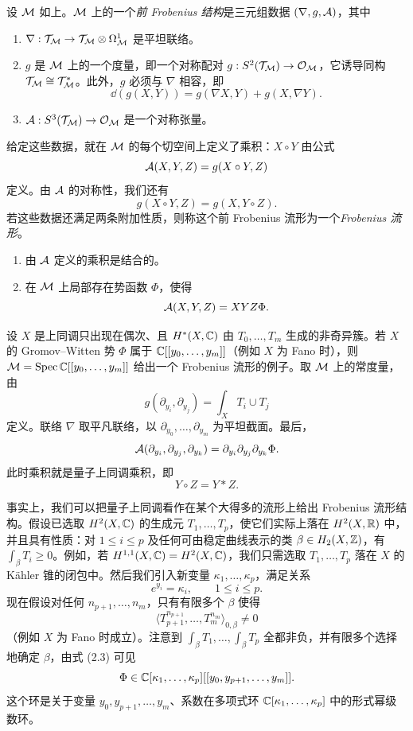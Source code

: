 \begin{definition}
设 $\mathcal{M}$ 如上。$\mathcal{M}$ 上的一个\emph{前 Frobenius 结构}是三元组数据 $(\nabla,g,\mathcal{A})$，其中
\begin{enumerate}[label=(\arabic*)]
\item $\nabla:\mathcal{T}_{\mathcal{M}}\to\mathcal{T}_{\mathcal{M}}\otimes\Omega^1_{\mathcal{M}}$ 是平坦联络。
\item $g$ 是 $\mathcal{M}$ 上的一个度量，即一个对称配对 $g:S^2(\mathcal{T}_{\mathcal{M}})\to\mathcal{O}_{\mathcal{M}}$，它诱导同构 $\mathcal{T}_{\mathcal{M}}\cong\mathcal{T}_{\mathcal{M}}^{*}$。此外，$g$ 必须与 $\nabla$ 相容，即
\[
\dd(g(X,Y))=g(\nabla X,Y)+g(X,\nabla Y).
\]
\item $\mathcal{A}:S^3(\mathcal{T}_{\mathcal{M}})\to\mathcal{O}_{\mathcal{M}}$ 是一个对称张量。
\end{enumerate}
给定这些数据，就在 $\mathcal{M}$ 的每个切空间上定义了乘积：$X\circ Y$ 由公式
\[
\mathcal{A}(X,Y,Z)=g(X\circ Y,Z)
\]
定义。由 $\mathcal{A}$ 的对称性，我们还有
\begin{equation}
g(X\circ Y,Z)=g(X,Y\circ Z). \tag{2.4}
\end{equation}
若这些数据还满足两条附加性质，则称这个前 Frobenius 流形为一个\emph{Frobenius 流形}。
\begin{enumerate}[label=(\arabic*),start=4]
\item 由 $\mathcal{A}$ 定义的乘积是结合的。
\item 在 $\mathcal{M}$ 上局部存在势函数 $\Phi$，使得
\[
\mathcal{A}(X,Y,Z)=XYZ\Phi.
\]
\end{enumerate}
\end{definition}

\begin{example}
设 $X$ 是上同调只出现在偶次、且 $H^{*}(X,\mathbb{C})$ 由 $T_0,\dots,T_m$ 生成的非奇异簇。若 $X$ 的 Gromov–Witten 势 $\Phi$ 属于 $\mathbb{C}[[y_0,\dots,y_m]]$（例如 $X$ 为 Fano 时），则 $\mathcal{M}=\operatorname{Spec}\mathbb{C}[[y_0,\dots,y_m]]$ 给出一个 Frobenius 流形的例子。取 $\mathcal{M}$ 上的常度量，由
\[
g(\partial_{y_i},\partial_{y_j})=\int_X T_i\cup T_j
\]
定义。联络 $\nabla$ 取平凡联络，以 $\partial_{y_0},\dots,\partial_{y_m}$ 为平坦截面。最后，
\[
\mathcal{A}(\partial_{y_i},\partial_{y_j},\partial_{y_k})=\partial_{y_i}\partial_{y_j}\partial_{y_k}\Phi.
\]
此时乘积就是量子上同调乘积，即
\[
Y\circ Z=Y*Z.
\]
\end{example}

事实上，我们可以把量子上同调看作在某个大得多的流形上给出 Frobenius 流形结构。假设已选取 $H^2(X,\mathbb{C})$ 的生成元 $T_1,\dots,T_p$，使它们实际上落在 $H^2(X,\mathbb{R})$ 中，并且具有性质：对 $1\le i\le p$ 及任何可由稳定曲线表示的类 $\beta\in H_2(X,\mathbb{Z})$，有 $\int_{\beta}T_i\ge 0$。例如，若 $H^{1,1}(X,\mathbb{C})=H^2(X,\mathbb{C})$，我们只需选取 $T_1,\dots,T_p$ 落在 $X$ 的 Kähler 锥的闭包中。然后我们引入新变量 $\kappa_1,\dots,\kappa_p$，满足关系
\[
e^{y_i}=\kappa_i,\qquad 1\le i\le p.
\]
现在假设对任何 $n_{p+1},\dots,n_m$，只有有限多个 $\beta$ 使得
\[
\langle T_{p+1}^{n_{p+1}},\dots,T_m^{n_m}\rangle_{0,\beta}\neq 0
\]
（例如 $X$ 为 Fano 时成立）。注意到 $\int_{\beta}T_1,\dots,\int_{\beta}T_p$ 全都非负，并有限多个选择地确定 $\beta$，由式 (2.3) 可见
\[
\Phi\in\mathbb{C}[\kappa_1,\dots,\kappa_p][[y_0,y_{p+1},\dots,y_m]].
\]
这个环是关于变量 $y_0,y_{p+1},\dots,y_m$、系数在多项式环 $\mathbb{C}[\kappa_1,\dots,\kappa_p]$ 中的形式幂级数环。

